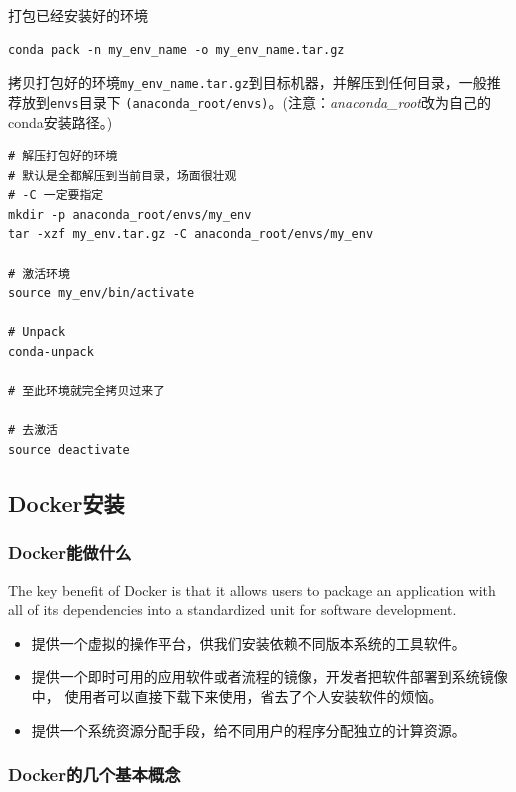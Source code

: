 \documentclass[]{article}
\numberwithin{figure}{section}
\numberwithin{table}{section}
\begin{document}
打包已经安装好的环境

\begin{verbatim}
conda pack -n my_env_name -o my_env_name.tar.gz
\end{verbatim}

拷贝打包好的环境\texttt{my\_env\_name.tar.gz}到目标机器，并解压到任何目录，一般推荐放到\texttt{envs}目录下 \texttt{(anaconda\_root/envs)}。(注意：\emph{anaconda\_root}改为自己的conda安装路径。)

\begin{verbatim}
# 解压打包好的环境
# 默认是全都解压到当前目录，场面很壮观
# -C 一定要指定
mkdir -p anaconda_root/envs/my_env
tar -xzf my_env.tar.gz -C anaconda_root/envs/my_env

# 激活环境
source my_env/bin/activate

# Unpack
conda-unpack

# 至此环境就完全拷贝过来了

# 去激活
source deactivate
\end{verbatim}

\hypertarget{docker}{%
\subsection{Docker安装}\label{docker}}

\hypertarget{docker_what}{%
\subsubsection{Docker能做什么}\label{docker_what}}

The key benefit of Docker is that it allows users to package an
application with all of its dependencies into a standardized unit for
software development.

\begin{itemize}
\item
  提供一个虚拟的操作平台，供我们安装依赖不同版本系统的工具软件。
\item
  提供一个即时可用的应用软件或者流程的镜像，开发者把软件部署到系统镜像中，
  使用者可以直接下载下来使用，省去了个人安装软件的烦恼。
\item
  提供一个系统资源分配手段，给不同用户的程序分配独立的计算资源。
\end{itemize}

\hypertarget{docker_basic}{%
\subsubsection{Docker的几个基本概念}\label{docker_basic}}
\end{document}
